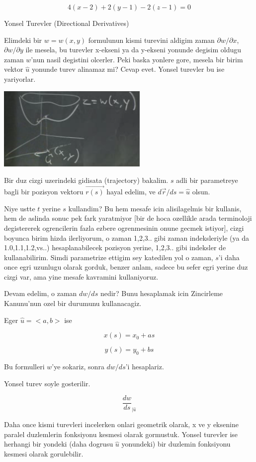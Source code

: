 \documentclass[12pt,fleqn]{article}
\begin{document}
\[ 4(x-2) + 2(y-1) - 2(z-1) = 0 \]

Yonsel Turevler (Directional Derivatives) 

Elimdeki bir $w = w(x,y)$ formulunun kismi turevini aldigim zaman 
$\partial  w/\partial x$, $\partial w/\partial y$ ile mesela, bu turevler x-ekseni ya da y-ekseni 
yonunde degisim oldugu zaman $w$'nun nasil degistini olcerler. Peki baska
yonlere gore, mesela bir birim vektor $\hat{u}$ yonunde turev alinamaz mi? 
Cevap evet. Yonsel turevler bu ise yariyorlar. 

\includegraphics[height=4cm]{12_6.png}

Bir duz cizgi uzerindeki gidisata (trajectory) bakalim. $s$ adli bir
parametreye bagli bir pozisyon vektoru $\vec{r(s)}$ hayal edelim, ve
$d\vec{r}/ds = \hat{u}$ olsun. 

Niye ustte $t$ yerine $s$ kullandim? Bu hem mesafe icin alisilagelmis bir
kullanis, hem de aslinda sonuc pek fark yaratmiyor [bir de hoca ozellikle
arada terminoloji degistererek ogrencilerin fazla ezbere ogrenmesinin onune
gecmek istiyor], cizgi boyunca birim hizda ilerliyorum, o zaman
1,2,3.. gibi zaman indeksleriyle (ya da 1.0,1.1,1.2,vs..)  hesaplanabilecek
pozisyon yerine, 1,2,3.. gibi indeksler de kullanabilirim. Simdi
parametrize ettigim sey katedilen yol o zaman, $s$'i daha once egri
uzunlugu olarak gorduk, benzer anlam, sadece bu sefer egri yerine duz cizgi
var, ama yine mesafe kavramini kullaniyoruz.

Devam edelim, o zaman $dw/ds$ nedir? Bunu hesaplamak icin Zincirleme
Kanunu'nun ozel bir durumunu kullanacagiz. 

Eger $\hat{u} = <a,b>$ ise

\[ x(s) = x_0 + as \]

\[ y(s) = y_0 + bs \]

Bu formulleri $w$'ye sokariz, sonra $dw/ds$'i hesaplariz. 

Yonsel turev soyle gosterilir.

\[ \frac{dw}{ds}_{|\hat{u}} \]

Daha once kismi turevleri incelerken onlari geometrik olarak, x ve y
eksenine paralel duzlemlerin fonksiyonu kesmesi olarak gormustuk. Yonsel
turevler ise herhangi bir yondeki (daha dogrusu $\hat{u}$ yonundeki) bir
duzlemin fonksiyonu kesmesi olarak gorulebilir.
\end{document}
